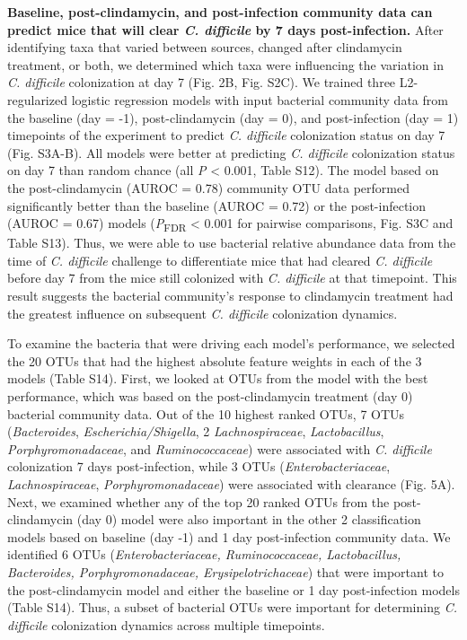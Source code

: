 \documentclass[
  11pt,
]{article}
\begin{document}
\textbf{Baseline, post-clindamycin, and post-infection community data
can predict mice that will clear \emph{C. difficile} by 7 days
post-infection.} After identifying taxa that varied between sources,
changed after clindamycin treatment, or both, we determined which taxa
were influencing the variation in \emph{C. difficile} colonization at
day 7 (Fig. 2B, Fig. S2C). We trained three L2-regularized logistic
regression models with input bacterial community data from the baseline
(day = -1), post-clindamycin (day = 0), and post-infection (day = 1)
timepoints of the experiment to predict \emph{C. difficile} colonization
status on day 7 (Fig. S3A-B). All models were better at predicting
\emph{C. difficile} colonization status on day 7 than random chance (all
\emph{P} \textless{} 0.001, Table S12). The model based on the
post-clindamycin (AUROC = 0.78) community OTU data performed
significantly better than the baseline (AUROC = 0.72) or the
post-infection (AUROC = 0.67) models (\emph{P}\textsubscript{FDR}
\textless{} 0.001 for pairwise comparisons, Fig. S3C and Table S13).
Thus, we were able to use bacterial relative abundance data from the
time of \emph{C. difficile} challenge to differentiate mice that had
cleared \emph{C. difficile} before day 7 from the mice still colonized
with \emph{C. difficile} at that timepoint. This result suggests the
bacterial community's response to clindamycin treatment had the greatest
influence on subsequent \emph{C. difficile} colonization dynamics.

To examine the bacteria that were driving each model's performance, we
selected the 20 OTUs that had the highest absolute feature weights in
each of the 3 models (Table S14). First, we looked at OTUs from the
model with the best performance, which was based on the post-clindamycin
treatment (day 0) bacterial community data. Out of the 10 highest ranked
OTUs, 7 OTUs (\emph{Bacteroides}, \emph{Escherichia/Shigella}, 2
\emph{Lachnospiraceae}, \emph{Lactobacillus}, \emph{Porphyromonadaceae},
and \emph{Ruminococcaceae}) were associated with \emph{C. difficile}
colonization 7 days post-infection, while 3 OTUs
(\emph{Enterobacteriaceae}, \emph{Lachnospiraceae},
\emph{Porphyromonadaceae}) were associated with clearance (Fig. 5A).
Next, we examined whether any of the top 20 ranked OTUs from the
post-clindamycin (day 0) model were also important in the other 2
classification models based on baseline (day -1) and 1 day
post-infection community data. We identified 6 OTUs
(\emph{Enterobacteriaceae, Ruminococcaceae, Lactobacillus, Bacteroides,
Porphyromonadaceae, Erysipelotrichaceae}) that were important to the
post-clindamycin model and either the baseline or 1 day post-infection
models (Table S14). Thus, a subset of bacterial OTUs were important for
determining \emph{C. difficile} colonization dynamics across multiple
timepoints.
\end{document}
